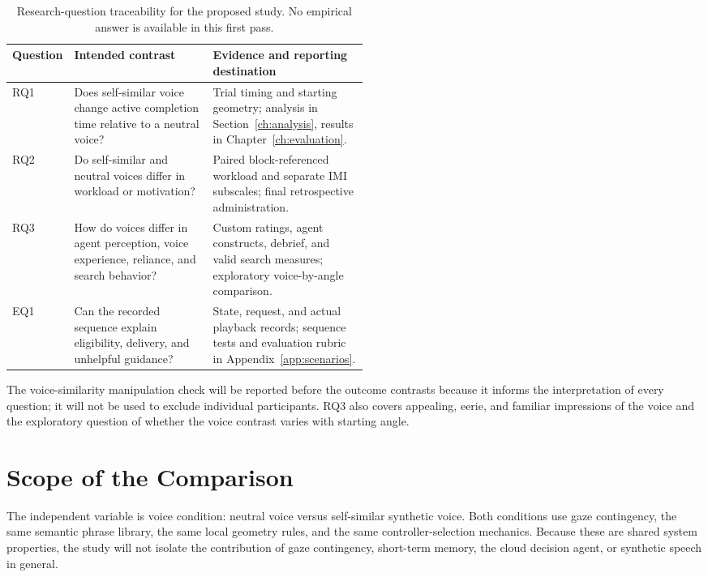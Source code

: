 \begin{table}[htbp]\centering
\caption[Research questions and evidence requirements]{Research-question traceability for the proposed study. No empirical answer is available in this first pass.}
\label{tab:rq-map}
\small{}
\begin{tabularx}{\linewidth}{@{}p{0.12\linewidth}p{0.39\linewidth}X@{}}\toprule
Question & Intended contrast & Evidence and reporting destination \\\midrule
RQ1 & Does self-similar voice change active completion time relative to a neutral voice? & Trial timing and starting geometry; analysis in Section~\ref{ch:analysis}, results in Chapter~\ref{ch:evaluation}. \\
RQ2 & Do self-similar and neutral voices differ in workload or motivation? & Paired block-referenced workload and separate IMI subscales; final retrospective administration. \\
RQ3 & How do voices differ in agent perception, voice experience, reliance, and search behavior? & Custom ratings, agent constructs, debrief, and valid search measures; exploratory voice-by-angle comparison. \\
EQ1 & Can the recorded sequence explain eligibility, delivery, and unhelpful guidance? & State, request, and actual playback records; sequence tests and evaluation rubric in Appendix~\ref{app:scenarios}. \\\bottomrule
\end{tabularx}
\end{table}

The voice-similarity manipulation check will be reported before the outcome contrasts because it informs the interpretation of every question; it will not be used to exclude individual participants. RQ3 also covers appealing, eerie, and familiar impressions of the voice and the exploratory question of whether the voice contrast varies with starting angle.

\section{Scope of the Comparison}
The independent variable is voice condition: neutral voice versus self-similar synthetic voice. Both conditions use gaze contingency, the same semantic phrase library, the same local geometry rules, and the same controller-selection mechanics. Because these are shared system properties, the study will not isolate the contribution of gaze contingency, short-term memory, the cloud decision agent, or synthetic speech in general.

